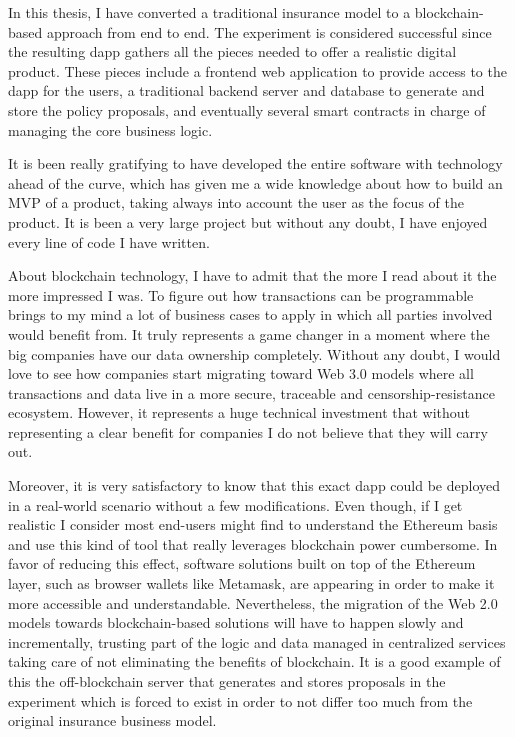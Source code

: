 \documentclass[a4paper,12pt]{article}
\begin{document}
{
In this thesis, I have converted a traditional insurance model to a blockchain-based approach from end to end. The experiment is considered successful since the resulting dapp gathers all the pieces needed to offer a realistic digital product. These pieces include a frontend web application to provide access to the dapp for the users, a traditional backend server and database to generate and store the policy proposals, and eventually several smart contracts in charge of managing the core business logic.

It is been really gratifying to have developed the entire software with technology ahead of the curve, which has given me a wide knowledge about how to build an MVP of a product, taking always into account the user as the focus of the product. It is been a very large project but without any doubt, I have enjoyed every line of code I have written.

About blockchain technology, I have to admit that the more I read about it the more impressed I was. To figure out how transactions can be programmable brings to my mind a lot of business cases to apply in which all parties involved would benefit from. It truly represents a game changer in a moment where the big companies have our data ownership completely. Without any doubt, I would love to see how companies start migrating toward Web 3.0 models where all transactions and data live in a more secure, traceable and censorship-resistance ecosystem. However, it represents a huge technical investment that without representing a clear benefit for companies I do not believe that they will carry out.

Moreover, it is very satisfactory to know that this exact dapp could be deployed in a real-world scenario without a few modifications. Even though, if I get realistic I consider most end-users might find to understand the Ethereum basis and use this kind of tool that really leverages blockchain power cumbersome. In favor of reducing this effect, software solutions built on top of the Ethereum layer, such as browser wallets like Metamask, are appearing in order to make it more accessible and understandable. Nevertheless, the migration of the Web 2.0 models towards blockchain-based solutions will have to happen slowly and incrementally, trusting part of the logic and data managed in centralized services taking care of not eliminating the benefits of blockchain. It is a good example of this the off-blockchain server that generates and stores proposals in the experiment which is forced to exist in order to not differ too much from the original insurance business model.

}
\end{document}

